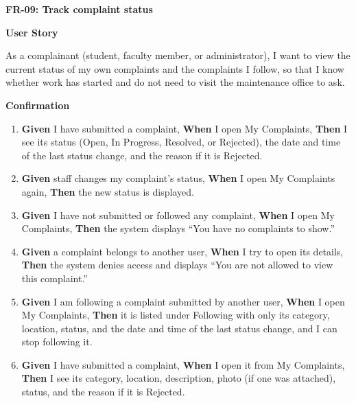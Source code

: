 \noindent\textbf{FR-09: Track complaint status}\par\nopagebreak[4]\smallskip
\noindent\textbf{User Story}\par\nopagebreak[4]
\noindent As a complainant (student, faculty member, or administrator), I want to view the current status of my own complaints and the complaints I follow, so that I know whether work has started and do not need to visit the maintenance office to ask.\par\smallskip
{\makeatletter
{}
\makeatother
\noindent\textbf{Confirmation}\par\nopagebreak[4]\vspace{-6pt}\nopagebreak[4]
\begin{enumerate}\setlength{\itemsep}{2pt}\setlength{\parsep}{0pt}\setlength{\topsep}{2pt}\setlength{\partopsep}{0pt}
  \item \textbf{Given} I have submitted a complaint, \textbf{When} I open My Complaints, \textbf{Then} I see its status (Open, In Progress, Resolved, or Rejected), the date and time of the last status change, and the reason if it is Rejected.
  \item \textbf{Given} staff changes my complaint's status, \textbf{When} I open My Complaints again, \textbf{Then} the new status is displayed.
  \item \textbf{Given} I have not submitted or followed any complaint, \textbf{When} I open My Complaints, \textbf{Then} the system displays ``You have no complaints to show.''
  \item \textbf{Given} a complaint belongs to another user, \textbf{When} I try to open its details, \textbf{Then} the system denies access and displays ``You are not allowed to view this complaint.''
  \item \textbf{Given} I am following a complaint submitted by another user, \textbf{When} I open My Complaints, \textbf{Then} it is listed under Following with only its category, location, status, and the date and time of the last status change, and I can stop following it.
  \item \textbf{Given} I have submitted a complaint, \textbf{When} I open it from My Complaints, \textbf{Then} I see its category, location, description, photo (if one was attached), status, and the reason if it is Rejected.
\end{enumerate}}
\medskip
 
